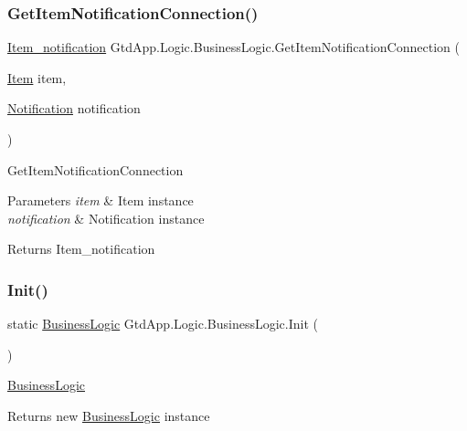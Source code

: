 \subsubsection{\texorpdfstring{Get\+Item\+Notification\+Connection()}{GetItemNotificationConnection()}}
{\footnotesize\ttfamily \mbox{\hyperlink{class_gtd_app_1_1_data_1_1_item__notification}{Item\+\_\+notification}} Gtd\+App.\+Logic.\+Business\+Logic.\+Get\+Item\+Notification\+Connection (\begin{DoxyParamCaption}\item[{\mbox{\hyperlink{class_gtd_app_1_1_data_1_1_item}{Item}}}]{item,  }\item[{\mbox{\hyperlink{class_gtd_app_1_1_data_1_1_notification}{Notification}}}]{notification }\end{DoxyParamCaption})}



Get\+Item\+Notification\+Connection 


\begin{DoxyParams}{Parameters}
{\em item} & Item instance\\
\hline
{\em notification} & Notification instance\\
\hline
\end{DoxyParams}
\begin{DoxyReturn}{Returns}
Item\+\_\+notification
\end{DoxyReturn}
\mbox{\label{class_gtd_app_1_1_logic_1_1_business_logic_abadac4866339d761399e001b333ea829}} 
\subsubsection{\texorpdfstring{Init()}{Init()}}
{\footnotesize\ttfamily static \mbox{\hyperlink{class_gtd_app_1_1_logic_1_1_business_logic}{Business\+Logic}} Gtd\+App.\+Logic.\+Business\+Logic.\+Init (\begin{DoxyParamCaption}{ }\end{DoxyParamCaption})\hspace{0.3cm}{\ttfamily [static]}}



\mbox{\hyperlink{class_gtd_app_1_1_logic_1_1_business_logic}{Business\+Logic}} 

\begin{DoxyReturn}{Returns}
new \mbox{\hyperlink{class_gtd_app_1_1_logic_1_1_business_logic}{Business\+Logic}} instance
\end{DoxyReturn}
\mbox{\label{class_gtd_app_1_1_logic_1_1_business_logic_a62422f0f7fedb58ed9681bc65e5927ed}} 
